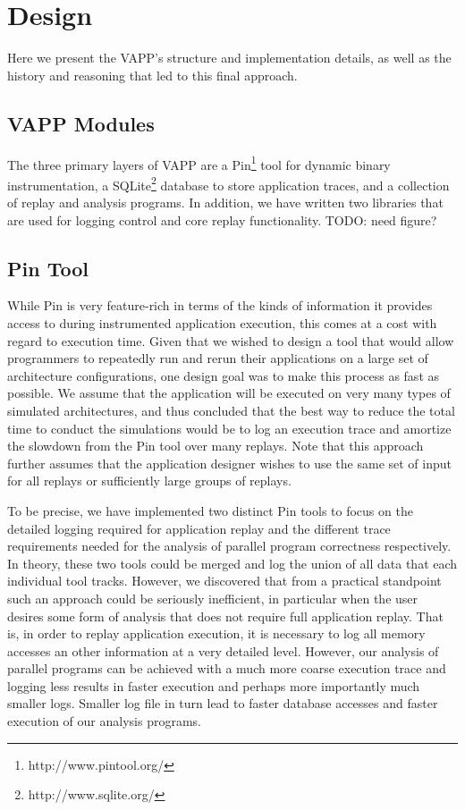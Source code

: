 \section{Design}
Here we present the VAPP's structure and implementation details,
as well as the history and reasoning that led to this final approach.

\subsection{VAPP Modules}
The three primary layers of VAPP are a Pin\footnote{http://www.pintool.org/}
tool for dynamic binary instrumentation, a SQLite\footnote{http://www.sqlite.org/}
database to store application traces, and a collection of replay and analysis
programs. In addition, we have written two libraries that are used for logging
control and core replay functionality. TODO: need figure?

\subsection{Pin Tool}
While Pin is very feature-rich in terms of the kinds of information
it provides access to during instrumented application execution, this
comes at a cost with regard to execution time.  Given that we wished to
design a tool that would allow programmers to repeatedly run and rerun
their applications on a large set of architecture configurations,
one design goal was to make this process as fast as possible.  We assume
that the application will be executed on very many types of simulated
architectures, and thus concluded that the best way to reduce the
total time to conduct the simulations would be to log an execution trace
and amortize the slowdown from the Pin tool over many replays.  Note that
this approach further assumes that the application designer wishes to
use the same set of input for all replays or sufficiently large
groups of replays.

To be precise, we have implemented two distinct Pin tools to focus
on the detailed logging required for application replay and the
different trace requirements needed for the analysis of parallel
program correctness respectively.  In theory, these two tools could
be merged and log the union of all data that each individual tool
tracks.  However, we discovered that from a practical standpoint
such an approach could be seriously inefficient, in particular
when the user desires some form of analysis that does not
require full application replay.  That is, in order to replay
application execution, it is necessary to log all memory accesses
an other information at a very detailed level.  However, our
analysis of parallel programs can be achieved with a much more
coarse execution trace and logging less results in faster execution
and perhaps more importantly much smaller logs.  Smaller log file in
turn lead to faster database accesses and faster execution of our
analysis programs.

